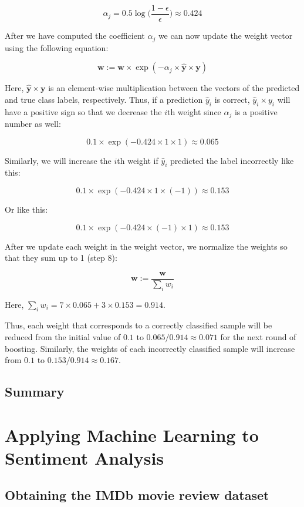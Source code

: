 \documentclass[letterpaper]{report}
\begin{document}
\[
\alpha_j = 0.5 \log \Bigg( \frac{1 - \epsilon}{\epsilon} \Bigg) \approx 0.424
\]

After we have computed the coefficient $\alpha_j$ we can now update the weight vector using the following equation:

\[
\mathbf{w} := \mathbf{w} \times \exp ( -\alpha_j \times \mathbf{\hat{y}} \times \mathbf{y})
\]

Here, $\mathbf{\hat{y}} \times \mathbf{y}$ is an element-wise multiplication between the vectors of the predicted and true class labels, respectively. Thus, if a prediction $\hat{y}_i$ is correct, $\hat{y}_i \times y_i$ will have a positive sign so that we decrease the $i$th weight since $\alpha_j$ is a positive number as well:

\[
0.1 \times \exp (-0.424 \times 1 \times 1) \approx 0.065
\]

Similarly, we will increase the $i$th weight if $\hat{y}_i$ predicted the label incorrectly
 like this:

\[
0.1 \times \exp (-0.424 \times 1 \times (-1)) \approx 0.153
\]

Or like this:

\[
0.1 \times \exp (-0.424 \times (-1) \times 1) \approx 0.153
\]

After we update each weight in the weight vector, we normalize the weights so that they sum up to 1 (step 8):

\[
\mathbf{w} := \frac{\mathbf{w}}{\sum_i w_i}
\]

Here, $\sum_i w_i = 7 \times 0.065 + 3 \times 0.153 = 0.914$.

Thus, each weight that corresponds to a correctly classified sample will be reduced from the initial value of $0.1$ to $0.065 / 0.914 \approx 0.071$ for the next round of boosting. Similarly, the weights of each incorrectly classified sample will increase from $0.1$ to $0.153 / 0.914 \approx 0.167$.

\section{Summary}



\chapter{Applying Machine Learning to Sentiment Analysis}

\section{Obtaining the IMDb movie review dataset}
\end{document}
